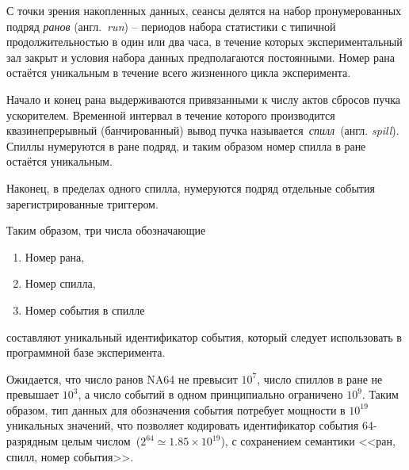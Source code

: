С точки зрения накопленных данных, сеансы делятся на набор
пронумерованных подряд \emph{ранов} (англ.~\emph{run}) --
периодов набора статистики с типичной
продолжительностью в один или два часа, в течение которых
экспериментальный зал закрыт и условия набора данных предполагаются
постоянными. Номер рана остаётся уникальным в течение всего
жизненного цикла эксперимента.

Начало и конец рана выдерживаются привязанными к числу актов
сбросов пучка ускорителем. Временной интервал в течение которого
производится квазинепрерывный (банчированный) вывод пучка
называется~\emph{спилл}~(англ. \emph{spill}). Спиллы нумеруются
в ране подряд, и таким образом номер спилла в ране остаётся
уникальным.

Наконец, в пределах одного спилла, нумеруются подряд отдельные
события зарегистрированные триггером.

Таким образом, три числа обозначающие
\begin{enumerate}
    \item Номер рана,
    \item Номер спилла,
    \item Номер события в спилле
\end{enumerate}
составляют уникальный идентификатор события, который следует
использовать в программной базе эксперимента.

Ожидается, что число ранов NA64 не превысит $10^7$, число
спиллов в ране не превышает $10^3$, а число событий в одном
принципиально ограничено $10^9$. Таким образом, тип данных
для обозначения события потребует мощности в $10^{19}$ уникальных
значений, что позволяет кодировать идентификатор события
64-разрядным целым числом~($2^{64} \simeq1.85\times10^{19}$),
с сохранением семантики <<ран, спилл, номер события>>.
